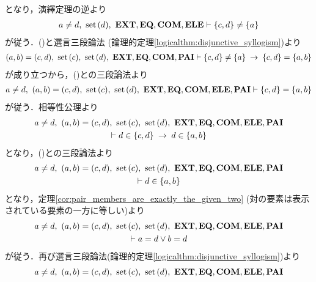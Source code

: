 \begin{sketch}
\begin{description}
				となり，演繹定理の逆より
				\begin{align}
					a \neq d,\ \operatorname*{set}\hspace{0.15em}(d),\ \mbox{{\bf EXT}},\mbox{{\bf EQ}},\mbox{\bf COM},\mbox{{\bf ELE}} \vdash \{c,d\} \neq \{a\}
					\label{fom:equality_of_ordered_pairs_16}
				\end{align}
				が従う．()と選言三段論法
				(論理的定理\ref{logicalthm:disjunctive_syllogism})より
				\begin{align}
					(a,b) = (c,d),\ \set{c},\ \set{d},\ \EXTAX,\EQAX,\COMAX,\PAIAX 
					\vdash \{c,d\} \neq \{a\} \rarrow \{c,d\} = \{a,b\}
				\end{align}
				が成り立つから，()との三段論法より
				\begin{align}
					a \neq d,\ (a,b) = (c,d),\ \set{c},\ \set{d},\ \EXTAX,\EQAX,\COMAX,\ELEAX,\PAIAX
					\vdash \{c,d\} = \{a,b\} 
				\end{align}
				が従う．相等性公理より
				\begin{align}
					\begin{gathered}
						a \neq d,\ (a,b) = (c,d),\ \set{c},\ \set{d},\ \EXTAX,\EQAX,\COMAX,\ELEAX,\PAIAX \\
						\vdash d \in \{c,d\} \rarrow d \in \{a,b\}
					\end{gathered}
				\end{align}
				となり，()との三段論法より
				\begin{align}
					\begin{gathered}
						a \neq d,\ (a,b) = (c,d),\ \set{c},\ \set{d},\ \EXTAX,\EQAX,\COMAX,\ELEAX,\PAIAX \\
						\vdash d \in \{a,b\}
					\end{gathered}
				\end{align}
				となり，定理\ref{cor:pair_members_are_exactly_the_given_two} (対の要素は表示されている要素の一方に等しい)より
				\begin{align}
					\begin{gathered}
						a \neq d,\ (a,b) = (c,d),\ \set{c},\ \set{d},\ \EXTAX,\EQAX,\COMAX,\ELEAX,\PAIAX \\
						\vdash a = d \vee b = d
					\end{gathered}
				\end{align}
				が従う．再び選言三段論法(論理的定理\ref{logicalthm:disjunctive_syllogism})より
				\begin{align}
					\begin{gathered}
						a \neq d,\ (a,b) = (c,d),\ \set{c},\ \set{d},\ \EXTAX,\EQAX,\COMAX,\ELEAX,\PAIAX \\

\end{gathered}
\end{align}
\end{description}
\end{sketch}
